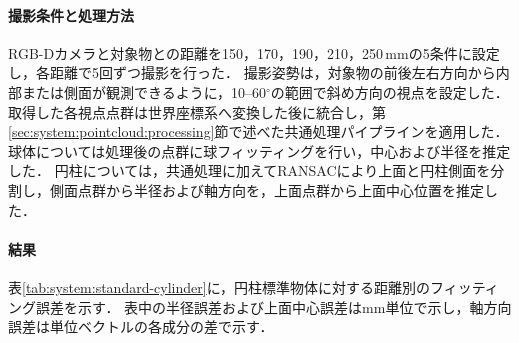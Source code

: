 \paragraph{撮影条件と処理方法}

RGB-Dカメラと対象物との距離を150，170，190，210，250\,mmの5条件に設定し，各距離で5回ずつ撮影を行った．
撮影姿勢は，対象物の前後左右方向から内部または側面が観測できるように，10--60$^{\circ}$の範囲で斜め方向の視点を設定した．
取得した各視点点群は世界座標系へ変換した後に統合し，第\ref{sec:system:pointcloud:processing}節で述べた共通処理パイプラインを適用した．
球体については処理後の点群に球フィッティングを行い，中心および半径を推定した．
円柱については，共通処理に加えてRANSACにより上面と円柱側面を分割し，側面点群から半径および軸方向を，上面点群から上面中心位置を推定した．

\paragraph{結果}

表\ref{tab:system:standard-cylinder}に，円柱標準物体に対する距離別のフィッティング誤差を示す．
表中の半径誤差および上面中心誤差はmm単位で示し，軸方向誤差は単位ベクトルの各成分の差で示す．

